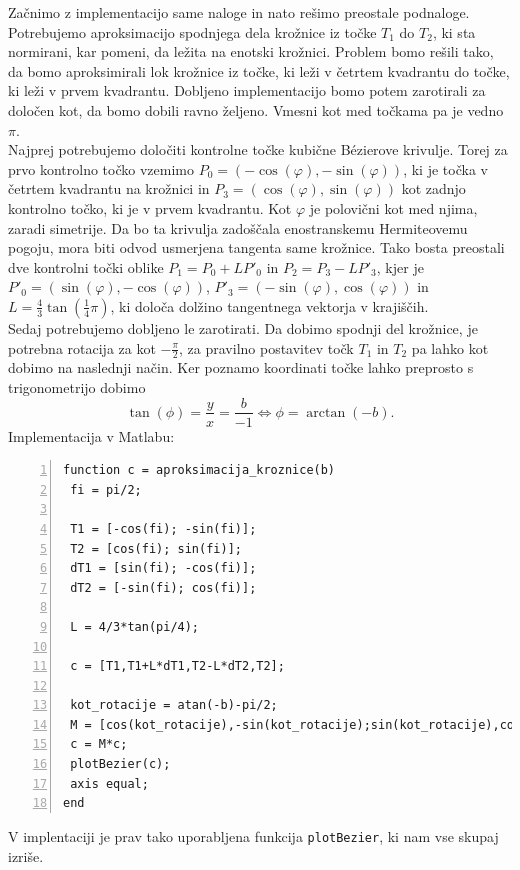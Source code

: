 \documentclass[a4paper,12pt]{article}
\begin{document}
	Začnimo z implementacijo same naloge in nato rešimo preostale podnaloge.
	Potrebujemo aproksimacijo spodnjega dela krožnice iz točke $T_1$ do $T_2$, ki sta normirani, kar pomeni, da ležita na enotski krožnici.
	Problem bomo rešili tako, da bomo aproksimirali lok krožnice iz točke, ki leži v četrtem kvadrantu do točke, ki leži v prvem kvadrantu. 
	Dobljeno implementacijo bomo potem zarotirali za določen kot, da bomo dobili ravno željeno. Vmesni kot med točkama pa je vedno $\pi$.
	\\
	Najprej potrebujemo določiti kontrolne točke kubične B\'{e}zierove krivulje. Torej za prvo kontrolno točko vzemimo $P_0 = (-\cos(\varphi), -\sin(\varphi))$, 
	ki je točka v četrtem kvadrantu na krožnici in 
	$P_3 = (\cos(\varphi), \sin(\varphi))$ kot zadnjo kontrolno točko, ki je v prvem kvadrantu. Kot $\varphi$ je polovični kot med njima, zaradi simetrije.
	Da bo ta krivulja zadoščala enostranskemu Hermiteovemu pogoju, mora biti odvod usmerjena tangenta same krožnice.
	Tako bosta preostali dve kontrolni točki oblike $P_1 = P_0 + LP'_0$ in $P_2 = P_3 - LP'_3$, kjer je $P'_0 = (\sin(\varphi), -\cos(\varphi))$, $P'_3 = (-\sin(\varphi), \cos(\varphi))$ in
	$L = \frac{4}{3} \tan(\frac{1}{4}\pi)$, ki določa dolžino tangentnega vektorja v krajiščih.
	\\
	Sedaj potrebujemo dobljeno le zarotirati. Da dobimo spodnji del krožnice, je potrebna rotacija za kot $-\frac{\pi}{2}$, za pravilno postavitev 
	točk $T_1$ in $T_2$ pa lahko kot dobimo na naslednji način. Ker poznamo koordinati točke lahko preprosto s trigonometrijo dobimo
	$$\tan(\phi) = \frac{y}{x} = \frac{b}{-1} \Leftrightarrow \phi = \arctan(-b).$$
	Implementacija v Matlabu:
	
	\begin{lstlisting}[style=Matlab-editor,	numbers=left,]
function c = aproksimacija_kroznice(b)
 fi = pi/2;
		
 T1 = [-cos(fi); -sin(fi)];
 T2 = [cos(fi); sin(fi)];
 dT1 = [sin(fi); -cos(fi)];
 dT2 = [-sin(fi); cos(fi)];
		
 L = 4/3*tan(pi/4);
		
 c = [T1,T1+L*dT1,T2-L*dT2,T2];
		
 kot_rotacije = atan(-b)-pi/2;
 M = [cos(kot_rotacije),-sin(kot_rotacije);sin(kot_rotacije),cos(kot_rotacije)];
 c = M*c;
 plotBezier(c); 
 axis equal;
end
	\end{lstlisting}
	
	\noindent V implentaciji je prav tako uporabljena funkcija \lstinline[style=Matlab-editor]!plotBezier!, ki nam vse skupaj izriše.
	
\end{document}
